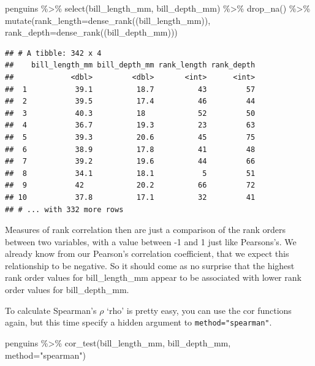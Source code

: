 \documentclass[
]{book}
\newenvironment{Shaded}{\begin{snugshade}}{\end{snugshade}}
\newcommand{\AttributeTok}[1]{\textcolor[rgb]{0.77,0.63,0.00}{#1}}
\newcommand{\FunctionTok}[1]{\textcolor[rgb]{0.00,0.00,0.00}{#1}}
\newcommand{\NormalTok}[1]{#1}
\newcommand{\SpecialCharTok}[1]{\textcolor[rgb]{0.00,0.00,0.00}{#1}}
\newcommand{\StringTok}[1]{\textcolor[rgb]{0.31,0.60,0.02}{#1}}
\begin{document}
\begin{Shaded}
\begin{Highlighting}[]
\NormalTok{penguins }\SpecialCharTok{\%\textgreater{}\%} \FunctionTok{select}\NormalTok{(bill\_length\_mm, }
\NormalTok{                    bill\_depth\_mm) }\SpecialCharTok{\%\textgreater{}\%} 
  \FunctionTok{drop\_na}\NormalTok{() }\SpecialCharTok{\%\textgreater{}\%} 
  \FunctionTok{mutate}\NormalTok{(}\AttributeTok{rank\_length=}\FunctionTok{dense\_rank}\NormalTok{((bill\_length\_mm)), }
         \AttributeTok{rank\_depth=}\FunctionTok{dense\_rank}\NormalTok{((bill\_depth\_mm)))}
\end{Highlighting}
\end{Shaded}

\begin{verbatim}
## # A tibble: 342 x 4
##    bill_length_mm bill_depth_mm rank_length rank_depth
##             <dbl>         <dbl>       <int>      <int>
##  1           39.1          18.7          43         57
##  2           39.5          17.4          46         44
##  3           40.3          18            52         50
##  4           36.7          19.3          23         63
##  5           39.3          20.6          45         75
##  6           38.9          17.8          41         48
##  7           39.2          19.6          44         66
##  8           34.1          18.1           5         51
##  9           42            20.2          66         72
## 10           37.8          17.1          32         41
## # ... with 332 more rows
\end{verbatim}

Measures of rank correlation then are just a comparison of the rank orders between two variables, with a value between -1 and 1 just like Pearsons's. We already know from our Pearson's correlation coefficient, that we expect this relationship to be negative. So it should come as no surprise that the highest rank order values for bill\_length\_mm appear to be associated with lower rank order values for bill\_depth\_mm.

To calculate Spearman's \(\rho\) `rho' is pretty easy, you can use the cor functions again, but this time specify a hidden argument to \texttt{method="spearman"}.

\begin{Shaded}
\begin{Highlighting}[]
\NormalTok{penguins }\SpecialCharTok{\%\textgreater{}\%} 
  \FunctionTok{cor\_test}\NormalTok{(bill\_length\_mm, bill\_depth\_mm, }\AttributeTok{method=}\StringTok{"spearman"}\NormalTok{)}
\end{Highlighting}
\end{Shaded}
\end{document}
